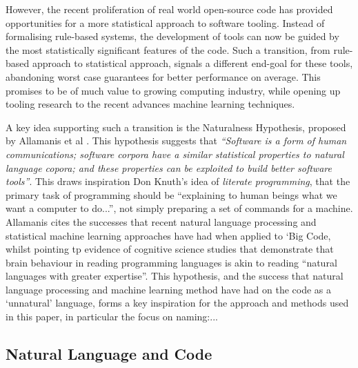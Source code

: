 However, the recent proliferation of real world open-source code has provided opportunities for a more statistical approach to software tooling. 
Instead of formalising rule-based systems, the development of tools can now be guided by the most statistically significant features of the code.
Such a transition, from rule-based approach to statistical approach, signals a different end-goal for these tools, abandoning worst case guarantees for better performance on average. %
This promises to be of much value to growing computing industry, while opening up tooling research to the recent advances machine learning techniques.
 
A key idea supporting such a transition is the Naturalness Hypothesis, proposed by Allamanis et al \cite{allamanis_mining_nodate}. 
This hypothesis suggests that \textit{``Software is a form of human communications; software corpora have a similar statistical properties to natural language copora; and these properties can be exploited to build better software tools''}.\cite{allamanis_mining_nodate} 
This draws inspiration Don Knuth's idea of \textit{literate programming}\cite{knuth_literate_1984}, that the primary task of programming should be ``explaining to human beings what we want a computer to do...''\cite{knuth_literate_1984}, not simply preparing a set of commands for a machine.
Allamanis cites the successes that recent natural language processing and statistical machine learning approaches have had when applied to `Big Code, whilst pointing tp evidence of cognitive science studies that demonstrate that brain behaviour in reading programming languages is akin to reading ``natural languages with greater expertise''\cite{floyd_decoding_2017}.
This hypothesis, and the success that natural language processing and machine learning method have had on the code as a `unnatural' language,  forms a key inspiration for the approach and methods used in this paper, in particular the focus on naming:...


\subsection{Natural Language and Code} %
\label{ssub:the_naturalness_hypothesis}

